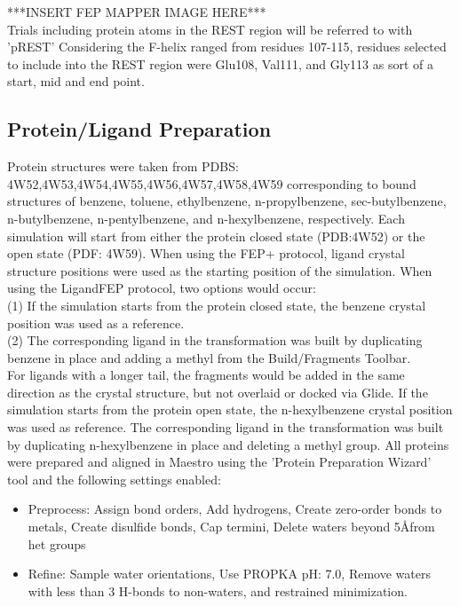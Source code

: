 \documentclass{article}
\begin{document}
***INSERT FEP MAPPER IMAGE HERE***\\

Trials including protein atoms in the REST region will be referred to with 'pREST'
Considering the F-helix ranged from residues 107-115, residues selected to include into the REST region were Glu108, Val111, and Gly113 as sort of a start, mid and end point. 

\subsection{Protein/Ligand Preparation}
Protein structures were taken from PDBS: 4W52,4W53,4W54,4W55,4W56,4W57,4W58,4W59 corresponding to bound structures of benzene, toluene, ethylbenzene, n-propylbenzene, sec-butylbenzene, n-butylbenzene, n-pentylbenzene, and n-hexylbenzene, respectively.
Each simulation will start from either the protein closed state (PDB:4W52) or the open state (PDF: 4W59).
When using the FEP+ protocol, ligand crystal structure positions were used as the starting position of the simulation.
When using the LigandFEP protocol, two options would occur:\\
(1) If the simulation starts from the protein closed state, the benzene crystal position was used as a reference.\\
(2) The corresponding ligand in the transformation was built by duplicating benzene in place and adding a methyl from the Build/Fragments Toolbar.\\

For ligands with a longer tail, the fragments would be added in the same direction as the crystal structure, but not overlaid or docked via Glide.
If the simulation starts from the protein open state, the n-hexylbenzene crystal position was used as reference. 
The corresponding ligand in the transformation was built by duplicating n-hexylbenzene in place and deleting a methyl group.
All proteins were prepared and aligned in Maestro using the 'Protein Preparation Wizard' tool and the following settings enabled:
   \begin{itemize}
      \item Preprocess: Assign bond orders, Add hydrogens, Create zero-order bonds to metals, Create disulfide bonds, Cap termini, Delete waters beyond 5\AA from het groups
      \item Refine: Sample water orientations, Use PROPKA pH: 7.0, Remove waters with less than 3 H-bonds to non-waters, and restrained minimization.
   \end{itemize}
   
\end{document}
